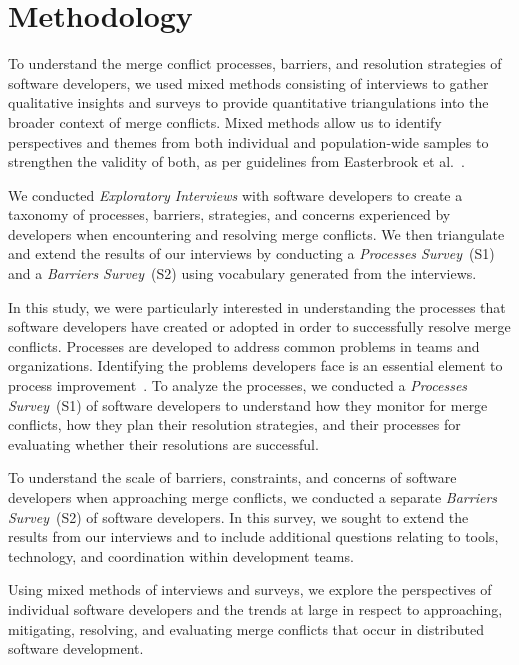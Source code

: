 
\section{Methodology}\label{methodology}


To understand the merge conflict processes, barriers, and resolution strategies of software developers, we used mixed methods consisting of interviews to gather qualitative insights and surveys to provide quantitative triangulations into the broader context of merge conflicts.
Mixed methods allow us to identify perspectives and themes from both individual and population-wide samples to strengthen the validity of both, as per guidelines from Easterbrook et al.~\cite{easterbrook2008selecting}.

We conducted \textit{Exploratory Interviews} with software developers to create a taxonomy of processes, barriers, strategies, and concerns experienced by developers when encountering and resolving merge conflicts.
We then triangulate and extend the results of our interviews by conducting a \textit{Processes Survey}~(S1) and a \textit{Barriers Survey}~(S2) using vocabulary generated from the interviews. 

In this study, we were particularly interested in understanding the processes that software developers have created or adopted in order to successfully resolve merge conflicts.
Processes are developed to address common problems in teams and organizations.
Identifying the problems developers face is an essential element to process improvement~\cite{beecham2003software}.
To analyze the processes, we conducted a \textit{Processes Survey}~(S1) of software developers to understand how they monitor for merge conflicts, how they plan their resolution strategies, and their processes for evaluating whether their resolutions are successful.

To understand the scale of barriers, constraints, and concerns of software developers when approaching merge conflicts, we conducted a separate \textit{Barriers Survey}~(S2) of software developers.
In this survey, we sought to extend the results from our interviews and to include additional questions relating to tools, technology, and coordination within development teams.

Using mixed methods of interviews and surveys, we explore the perspectives of individual software developers and the trends at large in respect to approaching, mitigating, resolving, and evaluating merge conflicts that occur in distributed software development.

